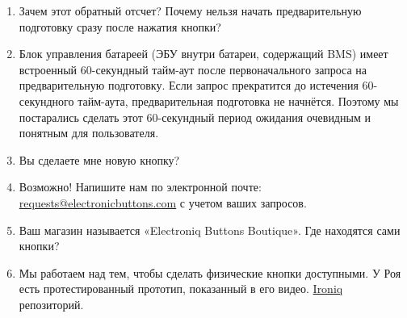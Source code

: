 \documentclass[superscriptaddress,onecolumn,floatfix]{revtex4-2}
\begin{document}
\begin{enumerate}
  \item[В:] Зачем этот обратный отсчет? Почему нельзя начать предварительную подготовку сразу после нажатия кнопки?
  \item[А:] Блок управления батареей (ЭБУ внутри батареи, содержащий BMS) имеет встроенный 60-секундный тайм-аут после первоначального запроса на предварительную подготовку. Если запрос прекратится до истечения 60-секундного тайм-аута, предварительная подготовка не начнётся. Поэтому мы постарались сделать этот 60-секундный период ожидания очевидным и понятным для пользователя.
  \item[В:] Вы сделаете мне новую кнопку?
  \item[А:] Возможно! Напишите нам по электронной почте: \href{mailto:requests@electroniqbuttons.com}{requests@electronicbuttons.com} с учетом ваших запросов.
  \item[В:] Ваш магазин называется «Electroniq Buttons Boutique». Где находятся сами кнопки?
  \item[А:] Мы работаем над тем, чтобы сделать физические кнопки доступными. У Роя есть протестированный прототип, показанный в его видео. \href{https://github.com/dragz/ironiq}{Ironiq} репозиторий.
\end{enumerate}
\appendix 

{}
\end{document}

